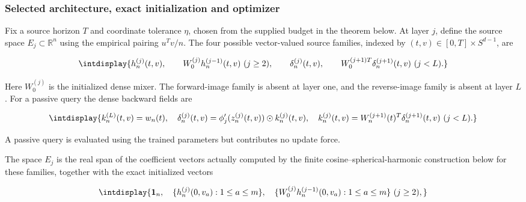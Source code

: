 \subsubsection{Selected architecture, exact initialization and optimizer}
\label{int:compact-runtime-definition}
\label{int:harmonic-runtime-definition}


Fix a source horizon \(T\) and coordinate tolerance \(\eta\), chosen from the supplied budget in the theorem below. At layer \(j\), define the source space \(E_j\subset\mathbb R^n\) using the empirical pairing \(u^Tv/n\). The four possible vector-valued source families, indexed by \((t,\allowbreak v)\in[0,\allowbreak T]\times S^{d-1}\), are


\begingroup\renewcommand{\theHequation}{intdisplay.153}
\begin{equation}
\intdisplay{
h_n^{(j)}(t,v),\qquad
W_0^{(j)}h_n^{(j-1)}(t,v)\ (j\ge2),\qquad
\delta_n^{(j)}(t,v),\qquad
W_0^{(j+1)T}\delta_n^{(j+1)}(t,v)\ (j<L).
}
\label{int:eq-0058-harmonic-source-families}
\end{equation}
\endgroup


Here \(W_0^{(j)}\) is the initialized dense mixer. The forward-image family is absent at layer one, and the reverse-image family is absent at layer \(L\). For a passive query the dense backward fields are


\begingroup\renewcommand{\theHequation}{intdisplay.154}
\begin{equation*}
\intdisplay{
k_n^{(L)}(t,v)=w_n(t),\quad
\delta_n^{(j)}(t,v)=\phi_j'(z_n^{(j)}(t,v))\odot k_n^{(j)}(t,v),\quad
k_n^{(j)}(t,v)=W_n^{(j+1)}(t)^T\delta_n^{(j+1)}(t,v)\ (j<L).
}
\end{equation*}
\endgroup


A passive query is evaluated using the trained parameters but contributes no update force.



The space \(E_j\) is the real span of the coefficient vectors actually computed by the finite cosine--spherical-harmonic construction below for these families, together with the exact initialized vectors


\begingroup\renewcommand{\theHequation}{intdisplay.155}
\begin{equation*}
\intdisplay{
\mathbf1_n,\quad
\{h_n^{(j)}(0,v_a):1\le a\le m\},\quad
\{W_0^{(j)}h_n^{(j-1)}(0,v_a):1\le a\le m\}\ (j\ge2),
}
\end{equation*}
\endgroup

